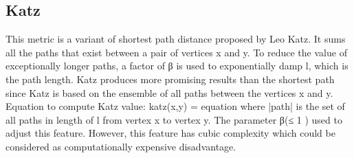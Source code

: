\subsection{Katz}
This metric is a variant of shortest path distance proposed by Leo Katz. It sums all the paths that exist between a pair of vertices x and y. To reduce the value of exceptionally longer paths, a factor of β is used to exponentially damp l, which is the path length. Katz produces more promising results than the shortest path since Katz is based on the ensemble of all paths between the vertices x and y. Equation to compute Katz value:
katz(x,y) = equation
where |path| is the set of all paths in length of l from vertex x to vertex y. The parameter β(≤ 1 ) used to adjust this feature. However, this feature has cubic complexity which could be considered as computationally expensive disadvantage.

%

